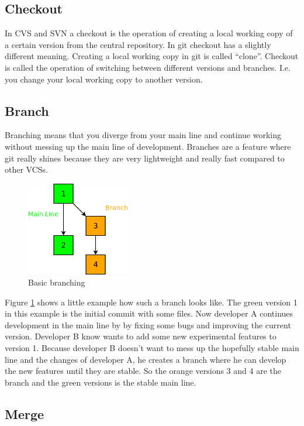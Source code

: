 \subsection{Checkout}

In CVS and SVN a checkout is the operation of creating a local working copy of a certain version from the 
central repository. In git checkout has a slightly different meaning. Creating a local working copy in git is 
called “clone”. Checkout is called the operation of switching between different versions and branches. I.e. 
you change your local working copy to another version.


\subsection{Branch}

Branching means that you diverge from your main line and continue working without messing up the main line of 
development. Branches are a feature where git really shines because they are very lightweight and really fast compared to other VCSs.

\begin{figure}[ht]
  \centering
  \includegraphics[width=0.4\textwidth]{img/Gen_Branch}
  \caption{Basic branching}
  \label{fig:gen_branch} 
\end{figure}

Figure \ref{fig:gen_branch} shows a little example how such a branch looks like. The green version 1 in 
this example is the initial commit with some files. Now developer A continues development in the main line 
by by fixing some bugs and improving the current version. Developer B know wants to add some new experimental 
features to version 1. Because developer B doesn't want to mess up the hopefully stable main line and the 
changes of developer A, he creates a branch where he can develop the new features until they are stable. 
So the orange versions 3 and 4 are the branch and the green versions is the stable main line.


\subsection{Merge}

